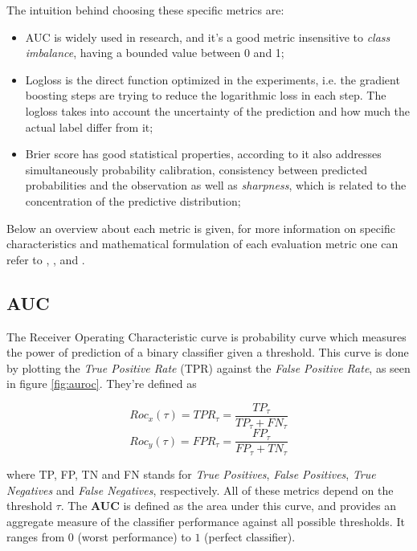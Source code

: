 The intuition behind choosing these specific metrics are:

\begin{itemize}
    \item AUC is widely used in research, and it's a good metric insensitive to \textit{class imbalance}, having a bounded value between 0 and 1;
    \item Logloss is the direct function optimized in the experiments, i.e. the gradient boosting steps are trying to reduce the logarithmic loss in each step. The logloss takes into account the uncertainty of the prediction and how much the actual label differ from it;
    \item Brier score has good statistical properties, according to \cite{rufibach2010use} it also addresses simultaneously probability calibration, consistency between predicted probabilities and the observation as well as \textit{sharpness}, which is related to the concentration of the predictive distribution;
\end{itemize}

Below an overview about each metric is given, for more information on specific characteristics and mathematical formulation of each evaluation metric one can refer to \cite{BROWN200624}, \cite{rufibach2010use}, \cite{kuhn2013applied} and \cite{hastie2009elements}.

\subsection{AUC}

The Receiver Operating Characteristic curve is probability curve which measures the power of prediction of a binary classifier given a threshold. This curve is done by plotting the \textit{True Positive Rate} (TPR) against the \textit{False Positive Rate}, as seen in figure \ref{fig:auroc}. They're defined as

$$Roc_x(\tau) = TPR_{\tau} = \frac{TP_{\tau}}{TP_{\tau} + FN_{\tau}}$$
$$Roc_y(\tau) = FPR_{\tau} = \frac{FP_{\tau}}{FP_{\tau} + TN_{\tau}}$$

where TP, FP, TN and FN stands for \textit{True Positives}, \textit{False Positives}, \textit{True Negatives} and \textit{False Negatives}, respectively. All of these metrics depend on the threshold $\tau$. The \textbf{AUC} is defined as the area under this curve, and provides an aggregate measure of the classifier performance against all possible thresholds. It ranges from $0$ (worst performance) to $1$ (perfect classifier).

